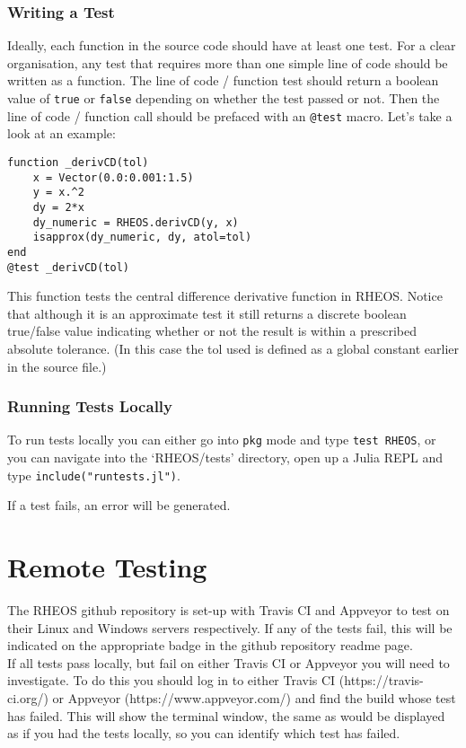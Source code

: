 \documentclass[]{article}
\newcommand{\cod}[1]{\colorbox{light-light-gray}{\texttt{#1}}}
\begin{document}
\subsubsection{Writing a Test}
Ideally, each function in the source code should have at least one test. For a clear organisation, any test that requires more than one simple line of code should be written as a function. The line of code / function test should return a boolean value of \cod{true} or \cod{false} depending on whether the test passed or not. Then the line of code / function call should be prefaced with an \cod{@test} macro. Let's take a look at an example:
\begin{verbatim}
function _derivCD(tol)
    x = Vector(0.0:0.001:1.5)
    y = x.^2
    dy = 2*x
    dy_numeric = RHEOS.derivCD(y, x)
    isapprox(dy_numeric, dy, atol=tol)
end
@test _derivCD(tol)
\end{verbatim}
This function tests the central difference derivative function in RHEOS. Notice that although it is an approximate test it still returns a discrete boolean true/false value indicating whether or not the result is within a prescribed absolute tolerance. (In this case the tol used is defined as a global constant earlier in the source file.)

\subsubsection{Running Tests Locally}
To run tests locally you can either go into \cod{pkg} mode and type \cod{test RHEOS}, or you can navigate into the `RHEOS/tests' directory, open up a Julia REPL and type \cod{include("runtests.jl")}.

If a test fails, an error will be generated. 

\section{Remote Testing}
The RHEOS github repository is set-up with Travis CI and Appveyor to test on their Linux and Windows servers respectively. If any of the tests fail, this will be indicated on the appropriate badge in the github repository readme page.\\

If all tests pass locally, but fail on either Travis CI or Appveyor you will need to investigate. To do this you should log in to either Travis CI (https://travis-ci.org/) or Appveyor (https://www.appveyor.com/) and find the build whose test has failed. This will show the terminal window, the same as would be displayed as if you had the tests locally, so you can identify which test has failed.
\end{document}
